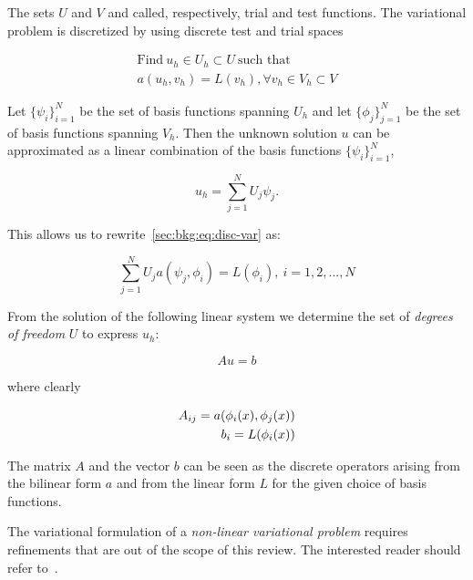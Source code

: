 The sets $U$ and $V$ and called, respectively, trial and test functions. The variational problem is discretized by using discrete test and trial spaces

\begin{equation}
\label{sec:bkg:eq:disc-var}
\begin{split}
\text{Find}\ u_h \in U_h \subset U\ \text{such that} \\
a(u_h, v_h) = L(v_h), \forall v_h \in V_h \subset V
\end{split}
\end{equation}

Let $\lbrace \psi_i \rbrace_{i=1}^N$ be the set of basis functions spanning $U_h$ and let $\lbrace \phi_j \rbrace_{j=1}^{N}$ be the set of basis functions spanning $V_h$. Then the unknown solution $u$ can be approximated as a linear combination of the basis functions $\lbrace \psi_i \rbrace_{i=1}^N$,

\begin{equation}
u_h = \sum_{j=1}^N U_j \psi_j.
\end{equation}

This allows us to rewrite~\ref{sec:bkg:eq:disc-var} as:

\begin{equation}
\sum_{j=1}^N U_j a(\psi_j, \phi_i) = L(\phi_i),\ i=1,2,...,N
\end{equation}


From the solution of the following linear system we determine the set of {\em degrees of freedom} $U$ to express $u_h$:

\begin{equation}
Au = b
\end{equation}

where clearly

\begin{equation}
\centering
\begin{split}
A_{ij} = a(\phi_i(x), \phi_j(x)) \\
b_i = L(\phi_i(x))
\end{split}
\end{equation}

The matrix $A$ and the vector $b$ can be seen as the discrete operators arising from the bilinear form $a$ and from the linear form $L$ for the given choice of basis functions.

The variational formulation of a {\em non-linear variational problem} requires refinements that are out of the scope of this review. The interested reader should refer to~\cite{brenner-and-scott}.

